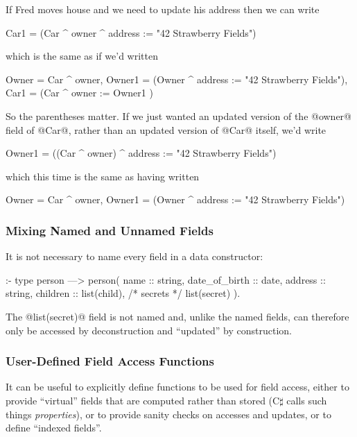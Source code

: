 If Fred moves house and we need to update his address then we can write
\begin{myverbatim}
    Car1 = (Car ^ owner ^ address := "42 Strawberry Fields")
\end{myverbatim}
which is the same as if we'd written
\begin{myverbatim}
    Owner  = Car ^ owner,
    Owner1 = (Owner ^ address := "42 Strawberry Fields"),
    Car1   = (Car   ^ owner   := Owner1                )
\end{myverbatim}
So the parentheses matter.  If we just wanted an updated version of the
@owner@ field of @Car@, rather than an updated version of @Car@ itself,
we'd write
\begin{myverbatim}
    Owner1 = ((Car ^ owner) ^ address := "42 Strawberry Fields")
\end{myverbatim}
which this time is the same as having written
\begin{myverbatim}
    Owner  = Car ^ owner,
    Owner1 = (Owner ^ address := "42 Strawberry Fields")
\end{myverbatim}

\subsubsection{Mixing Named and Unnamed Fields}

It is not necessary to name every field in a data constructor:
\begin{myverbatim}
:- type person
    --->    person(
                name            :: string,
                date_of_birth   :: date,
                address         :: string,
                children        :: list(child),
                /* secrets */      list(secret)
            ).
\end{myverbatim}
The @list(secret)@ field is not named and, unlike the named fields, can
therefore only be accessed by deconstruction and ``updated'' by
construction.

\subsubsection{User-Defined Field Access Functions}

It can be useful to explicitly define functions to be used for field access,
either to provide ``virtual'' fields that are computed rather than stored
(C$\sharp$ calls such things \emph{properties}), or to provide sanity checks
on accesses and updates, or to define ``indexed fields''.

